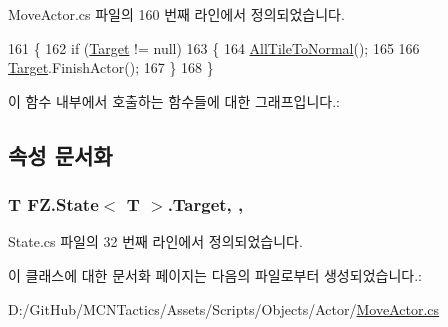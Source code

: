 Move\+Actor.\+cs 파일의 160 번째 라인에서 정의되었습니다.


\begin{DoxyCode}
161         \{
162             \textcolor{keywordflow}{if} (\hyperlink{class_f_z_1_1_state_a6927f5c9f2517052f9dc5596188e9d95}{Target} != null)
163             \{
164                 \hyperlink{class_move_actor_1_1_move_act_state_a8e1d5e7942d4f9de8c8e0732964c554b}{AllTileToNormal}();
165 
166                 \hyperlink{class_f_z_1_1_state_a6927f5c9f2517052f9dc5596188e9d95}{Target}.FinishActor();
167             \}
168         \}
\end{DoxyCode}


이 함수 내부에서 호출하는 함수들에 대한 그래프입니다.\+:




\subsection{속성 문서화}
\subsubsection[{\texorpdfstring{Target}{Target}}]{\setlength{\rightskip}{0pt plus 5cm}T {\bf F\+Z.\+State}$<$ T $>$.Target\hspace{0.3cm}{\ttfamily [get]}, {\ttfamily [protected]}, {\ttfamily [inherited]}}\hypertarget{class_f_z_1_1_state_a6927f5c9f2517052f9dc5596188e9d95}{}\label{class_f_z_1_1_state_a6927f5c9f2517052f9dc5596188e9d95}


State.\+cs 파일의 32 번째 라인에서 정의되었습니다.



이 클래스에 대한 문서화 페이지는 다음의 파일로부터 생성되었습니다.\+:\begin{DoxyCompactItemize}
\item 
D\+:/\+Git\+Hub/\+M\+C\+N\+Tactics/\+Assets/\+Scripts/\+Objects/\+Actor/\hyperlink{_move_actor_8cs}{Move\+Actor.\+cs}\end{DoxyCompactItemize}
